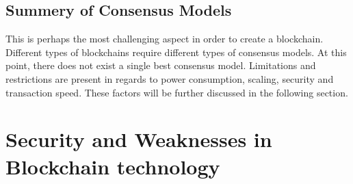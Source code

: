 

 
 
 \subsection{Summery of Consensus Models}
This is perhaps the most challenging aspect in order to create a blockchain. Different types of blockchains require different types of consensus models.  
At this point, there does not exist a single best consensus model. Limitations and restrictions are present in regards to power consumption, scaling, security and transaction speed. These factors will be further discussed in the following section. 

\section{Security and Weaknesses in Blockchain technology}



